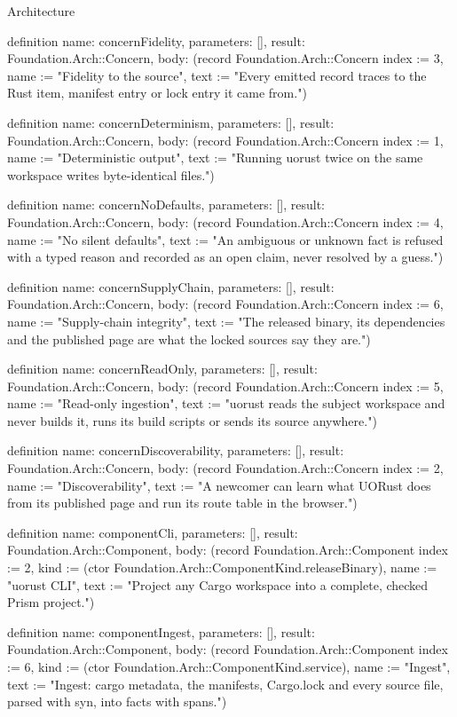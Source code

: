\begin{lexlean}{Architecture}
\begin{semanticmodule}
definition{
  name: concernFidelity,
  parameters: [],
  result: Foundation.Arch::Concern,
  body: (record Foundation.Arch::Concern {index := 3, name := "Fidelity to the source", text := "Every emitted record traces to the Rust item, manifest entry or lock entry it came from."})
}

definition{
  name: concernDeterminism,
  parameters: [],
  result: Foundation.Arch::Concern,
  body: (record Foundation.Arch::Concern {index := 1, name := "Deterministic output", text := "Running uorust twice on the same workspace writes byte-identical files."})
}

definition{
  name: concernNoDefaults,
  parameters: [],
  result: Foundation.Arch::Concern,
  body: (record Foundation.Arch::Concern {index := 4, name := "No silent defaults", text := "An ambiguous or unknown fact is refused with a typed reason and recorded as an open claim, never resolved by a guess."})
}

definition{
  name: concernSupplyChain,
  parameters: [],
  result: Foundation.Arch::Concern,
  body: (record Foundation.Arch::Concern {index := 6, name := "Supply-chain integrity", text := "The released binary, its dependencies and the published page are what the locked sources say they are."})
}

definition{
  name: concernReadOnly,
  parameters: [],
  result: Foundation.Arch::Concern,
  body: (record Foundation.Arch::Concern {index := 5, name := "Read-only ingestion", text := "uorust reads the subject workspace and never builds it, runs its build scripts or sends its source anywhere."})
}

definition{
  name: concernDiscoverability,
  parameters: [],
  result: Foundation.Arch::Concern,
  body: (record Foundation.Arch::Concern {index := 2, name := "Discoverability", text := "A newcomer can learn what UORust does from its published page and run its route table in the browser."})
}

definition{
  name: componentCli,
  parameters: [],
  result: Foundation.Arch::Component,
  body: (record Foundation.Arch::Component {index := 2, kind := (ctor Foundation.Arch::ComponentKind.releaseBinary), name := "uorust CLI", text := "Project any Cargo workspace into a complete, checked Prism project."})
}

definition{
  name: componentIngest,
  parameters: [],
  result: Foundation.Arch::Component,
  body: (record Foundation.Arch::Component {index := 6, kind := (ctor Foundation.Arch::ComponentKind.service), name := "Ingest", text := "Ingest: cargo metadata, the manifests, Cargo.lock and every source file, parsed with syn, into facts with spans."})
}


\end{semanticmodule}
\end{lexlean}
